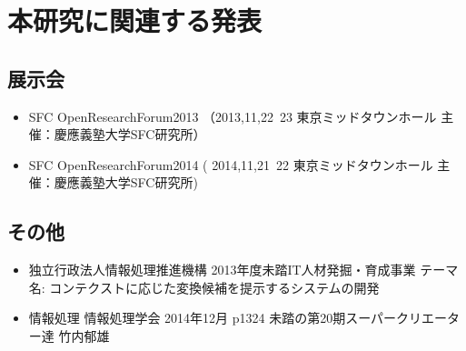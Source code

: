 \chapter{本研究に関連する発表}
\label{chap:publication}

\section{展示会}
\begin{itemize}
  \item SFC OpenResearchForum2013 （2013,11,22~23 東京ミッドタウンホール 主催：慶應義塾大学SFC研究所）
  \item SFC OpenResearchForum2014 ( 2014,11,21~22 東京ミッドタウンホール 主催：慶應義塾大学SFC研究所)
\end{itemize}

\section{その他}
\begin{itemize}
  \item 独立行政法人情報処理推進機構 2013年度未踏IT人材発掘・育成事業
        テーマ名: コンテクストに応じた変換候補を提示するシステムの開発
  \item 情報処理 情報処理学会 2014年12月 p1324
    未踏の第20期スーパークリエーター達 竹内郁雄
\end{itemize}
